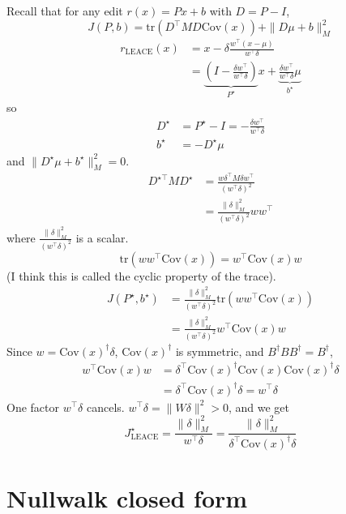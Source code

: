 \documentclass[10pt,a4paper,twocolumn]{article}
\begin{document}
	Recall that for any edit $r(x) = P x + b$ with $D = P - I$,
	$$J(P, b) = \mathrm{tr} \left( D^\top M D \mathrm{Cov}(x) \right) + \| D \mu + b \|_M^2$$
	$$\begin{aligned}
		r_{\mathrm{LEACE}}(x) & = x - \delta \frac{w^\top (x - \mu)}{w^\top \delta} \\
		& = \underbrace{\left( I - \frac{\delta w^\top}{w^\top \delta} \right)}_{P^\star} x + \underbrace{\frac{\delta w^\top}{w^\top \delta} \mu}_{b^\star}
	\end{aligned}$$
	so
	$$\begin{aligned}
		D^\star & = P^\star - I = - \frac{\delta w^\top}{w^\top \delta} \\
		b^\star & = - D^\star \mu
	\end{aligned}$$
	and $\| D^\star \mu + b^\star \|_M^2 = 0$.
	$$\begin{aligned}
		D^{\star \top} M D^\star & = \frac{w \delta^\top M \delta w^\top}{(w^\top \delta)^2} \\
		& = \frac{\| \delta \|_M^2}{(w^\top \delta)^2} w w^\top
	\end{aligned}$$
	where $\frac{\| \delta \|_M^2}{(w^\top \delta)^2}$ is a scalar.
	$$\mathrm{tr} \left( w w^\top \mathrm{Cov}(x) \right) = w^\top \mathrm{Cov}(x) w$$
	(I think this is called the cyclic property of the trace).
	$$\begin{aligned}
		J(P^\star, b^\star) & = \frac{\| \delta \|_M^2}{(w^\top \delta)^2} \mathrm{tr} \left( w w^\top \mathrm{Cov}(x) \right) \\
		& = \frac{\| \delta \|_M^2}{(w^\top \delta)^2} w^\top \mathrm{Cov}(x) w
	\end{aligned}$$
	Since $w = \mathrm{Cov}(x)^\dagger \delta$, $\mathrm{Cov}(x)^\dagger$ is symmetric, and $B^\dagger B B^\dagger = B^\dagger$,
	$$\begin{aligned}
		w^\top \mathrm{Cov}(x) w & = \delta^\top \mathrm{Cov}(x)^\dagger \mathrm{Cov}(x) \mathrm{Cov}(x)^\dagger \delta \\
		& = \delta^\top \mathrm{Cov}(x)^\dagger \delta = w^\top \delta
	\end{aligned}$$
	One factor $w^\top \delta$ cancels. $w^\top \delta = \| W \delta \|^2 > 0$, and we get
	$$J^\star_{\mathrm{LEACE}} = \frac{\| \delta \|_M^2}{w^\top \delta} = \frac{\| \delta \|_M^2}{\delta^\top \mathrm{Cov}(x)^\dagger \delta}$$

	\section{Nullwalk closed form}
\end{document}

